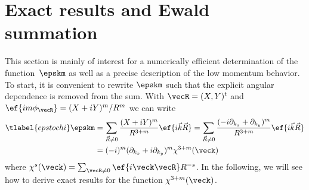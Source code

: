 %

\section{Exact results and Ewald summation}
This section is mainly of interest for a numerically efficient determination of the function~$\epskm$ as well as a precise description of the low momentum behavior.
To start, it is convenient to rewrite $\epskm$ such that the explicit angular dependence is removed from the sum. With $\vecR = (X, Y)^t$ and $\ef{im\phi_\vecR} = (X+iY)^m/R^m$ we can write
\begin{align} \tlabel{epstochi}
    \epskm
    &= \sum_{\vec{R}\ne 0} \frac{(X+i Y)^m}{R^{3+m}}\ef{i\vec{k}\vec{R}}
    = \sum_{\vec{R}\ne 0} \frac{(-i \partial_{k_x}+ \partial_{k_y})^m}{R^{3+m}} \ef{i\vec{k}\vec{R}} \\
    &= (-i)^m (\partial_{k_x}+ i \partial_{k_y})^m \chi^{3+m}(\veck)
\end{align}
where $\chi^s(\veck) = \sum_{\vecR\ne 0} \ef{i \veck \vecR} R^{-s}$.
In the following, we will see how to derive exact results for the function $\chi^{3+m}(\veck)$.

